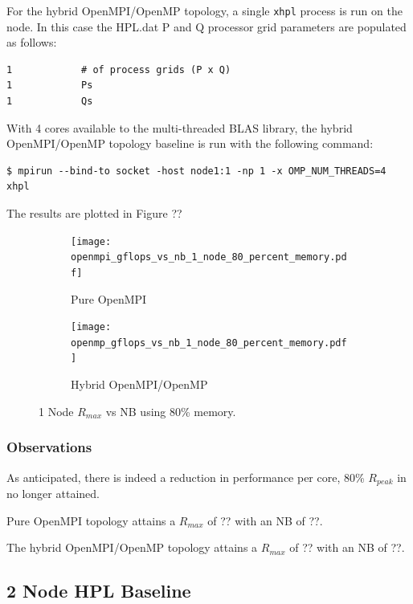 \documentclass{report}
\begin{document}
For the hybrid OpenMPI/OpenMP topology, a single \verb|xhpl| process is run on the node. In this case the HPL.dat P and Q processor grid parameters are populated as follows:

\lstset{style=listing}
\begin{lstlisting}[numbers=none]
1            # of process grids (P x Q)
1            Ps
1            Qs
\end{lstlisting}

With 4 cores available to the multi-threaded BLAS library, the hybrid OpenMPI/OpenMP topology baseline is run with the following command:

\lstset{style=type}
\begin{lstlisting}[]
$ mpirun --bind-to socket -host node1:1 -np 1 -x OMP_NUM_THREADS=4 xhpl
\end{lstlisting}

The results are plotted in Figure ??

\begin{figure}[H]
	\begin{subfigure}{1.0\textwidth}
		\centering
		\texttt{[image: openmpi\_gflops\_vs\_nb\_1\_node\_80\_percent\_memory.pdf]}
		\caption{Pure OpenMPI}
		\label{fig:subim1}
	\end{subfigure}
	\par\bigskip
	\begin{subfigure}{1.0\textwidth}
		\centering
		\texttt{[image: openmp\_gflops\_vs\_nb\_1\_node\_80\_percent\_memory.pdf]}
		\caption{Hybrid OpenMPI/OpenMP}
		\label{fig:subim2}
	\end{subfigure}
\caption{1 Node $R_{max}$ vs NB using 80\% memory.}
\label{fig:image2}
\end{figure}


%
%
\subsubsection{Observations}

As anticipated, there is indeed a reduction in performance per core, 80\% $R_{peak}$ in no longer attained.

Pure OpenMPI topology attains a $R_{max}$ of ?? with an NB of ??.

The hybrid OpenMPI/OpenMP topology attains a $R_{max}$ of ?? with an NB of ??.


%
%
\subsection{2 Node HPL Baseline}
\end{document}
